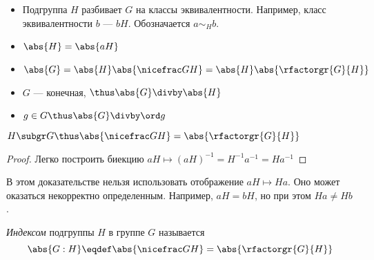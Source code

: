 \begin{corollary}
  \theoremlistshack
  \begin{itemize}
    \item Подгруппа $H$ разбивает $G$ на классы эквивалентности. Например, класс эквивалентности $b$ --- $bH$. Обозначается $a\sim_Hb$.
    \item $\abs{H}=\abs{aH}$
    \item $\abs{G}=\abs{H}\abs{\factorgr{G}{H}}=\abs{H}\abs{\rfactorgr{G}{H}}$
    \item $G$ --- конечная, $\thus \abs{G}\divby\abs{H}$
    \item $g\in G \thus \abs{G}\divby\ord g$
  \end{itemize}
\end{corollary}
\begin{corollary}

\end{corollary}
\begin{theorem}
  $H\subgr G \thus \abs{\factorgr{G}{H}}=\abs{\rfactorgr{G}{H}}$
\end{theorem}
\begin{proof}
  Легко построить биекцию $aH \mapsto (aH)^{-1}=H^{-1} a^{-1}=Ha^{-1}$
\end{proof}
\begin{remark}
  В этом доказательстве нельзя использовать отображение $aH \mapsto Ha$. Оно может оказаться некорректно определенным. Например, $aH=bH$, но при этом $Ha\neq Hb$.
\end{remark}
\begin{definition}
  \emph{Индексом} подгруппы $H$ в группе $G$ называется \[\abs{G:H}\eqdef\abs{\factorgr{G}{H}}=\abs{\rfactorgr{G}{H}}\]
\end{definition}

